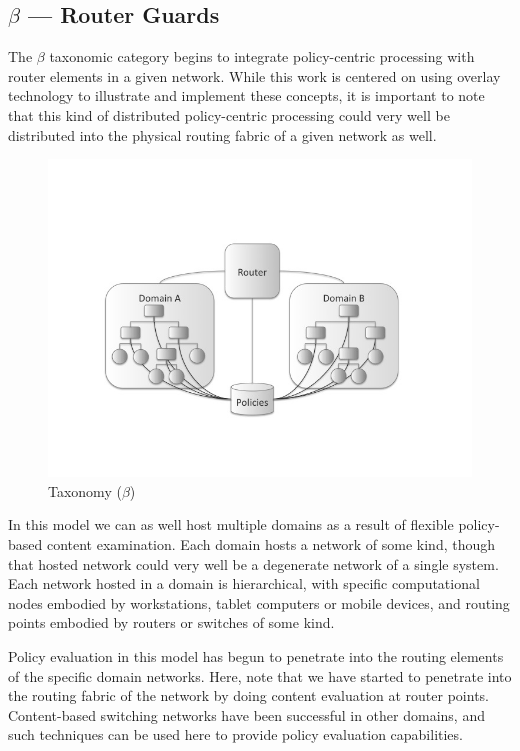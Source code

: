 \documentclass[12pt,letterpaper]{article}
\begin{document}
\subsection{$\beta$ --- Router Guards}
The $\beta$ taxonomic category begins to integrate policy-centric processing with router elements in a given network.  While this work is centered on using overlay technology to illustrate and implement these concepts, it is important to note that this kind of distributed policy-centric processing could very well be distributed into the physical routing fabric of a given network as well.

\begin{figure}[!t]
\centering
\includegraphics[width=5in]{model-beta}
\caption{Taxonomy ($\beta$)}
\label{fig:model:taxonomy-beta}
\end{figure}

In this model we can as well host multiple domains as a result of flexible policy-based content examination.  Each domain hosts a network of some kind, though that hosted network could very well be a degenerate network of a single system.  Each network hosted in a domain is hierarchical, with specific computational nodes embodied by workstations, tablet computers or mobile devices, and routing points embodied by routers or switches of some kind.

Policy evaluation in this model has begun to penetrate into the routing elements of the specific domain networks.  Here, note that we have started to penetrate into the routing fabric of the network by doing content evaluation at router points.  Content-based switching networks have been successful in other domains, and such techniques can be used here to provide policy evaluation capabilities.  
\end{document}
